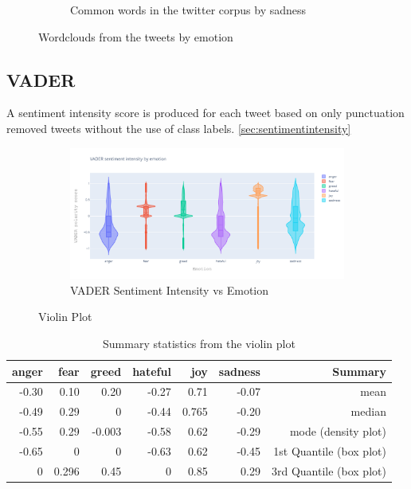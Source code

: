 \documentclass[a4paper, 12pt]{article}
\begin{document}
\begin{figure}[H]
\begin{subfigure}[f]{0.3\textwidth}
        \caption{Common words in the twitter corpus by sadness}
    \end{subfigure}
		    \caption{Wordclouds from the tweets by emotion}
    \label{fig:wordcloud_angreed}				
\end{figure}


\subsection{VADER}
A sentiment intensity score is produced for each tweet based on only punctuation removed tweets without the use of class labels. \ref{sec:sentimentintensity}
\begin{figure}[H]
    \centering
    \begin{subfigure}[a]{0.99\textwidth}
        \includegraphics[width=\textwidth]{res/vaderinitial.png}
        \caption{VADER Sentiment Intensity vs Emotion}
    \end{subfigure}
		\caption{Violin Plot}
		\label{fig:violin}
\end{figure}

\begin{table}[H]
\begin{center}
    \begin{tabular}{| r | r | r | r | r | r | r |}
        \hline
        anger & fear & greed & hateful & joy & sadness & Summary \\ \hline
        -0.30 &  0.10 &  0.20 &  -0.27 &   	0.71	& -0.07 & mean \\ \hline
        -0.49  & 0.29 &  0 &  -0.44 &  0.765 &	-0.20		& median \\ \hline
        -0.55 & 0.29&   -0.003 &  -0.58 &   0.62 &  -0.29  & mode (density plot) \\ \hline
        -0.65 &  0 & 		0 &   			-0.63&   0.62 &  -0.45 & 1st Quantile (box plot) \\ \hline
         0 & 0.296 & 		0.45 &   				0 &   0.85 &  0.29 &  3rd Quantile (box plot) \\ \hline
    \end{tabular}
    \caption{Summary statistics from the violin plot}
    \label{tab:violintab}
\end{center}
\end{table}
\end{document}

